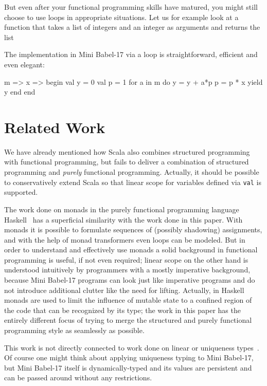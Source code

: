 \documentclass{llncs}
\newcommand{\bsrc}[1] {\lstinline!#1!}
\begin{document}
But even after your functional programming skills have matured, you might still choose to use loops in appropriate situations. Let us for example look at a function that takes a list of integers  and an integer  as arguments and returns the list

The implementation in Mini Babel-17 via a loop is straightforward, efficient and even elegant:
\begin{babellisting}
m => x => begin
              val y = 0
              val p = 1
  	      for a in m do 
  	        y = y + a*p
	        p = p * x
  	        yield y
	      end
	   end
\end{babellisting}

\section{Related Work}
We have already mentioned how Scala also combines structured programming with functional programming, but fails to deliver a combination of structured programming and \emph{purely} functional programming. Actually, it should be possible to conservatively extend Scala so that linear scope for variables defined via \bsrc{val} is supported.

The work done on monads in the purely functional programming language Haskell~\cite{monads} has a superficial similarity with the work done in this paper. With monads it is possible to formulate sequences of (possibly shadowing) assignments, and with the help of monad transformers even loops can be modeled. But in order to understand and effectively use monads a solid background in functional programming is useful, if not even required; linear scope on the other hand is understood intuitively by programmers with a mostly imperative background, because Mini Babel-17 programs can look just like imperative programs and do not introduce additional clutter like the need for lifting.
Actually, in Haskell monads are used to limit the influence of mutable state to a confined region of the code that can be recognized by its type; the work in this paper has  the entirely different focus of trying to merge the structured and purely functional programming style as seamlessly as possible.

This work is not directly connected to work done on linear or uniqueness types~\cite{lineartypes}. Of course one might think about applying uniqueness typing to Mini Babel-17, but Mini Babel-17 itself is dynamically-typed and its values are persistent and can be passed around without any restrictions.
\end{document}

